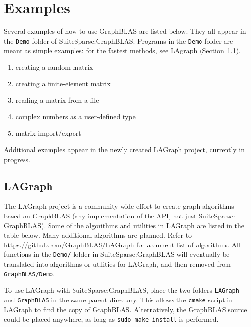 \documentclass[12pt]{article}
\begin{document}
\section{Examples} %
\label{examples}

Several examples of how to use GraphBLAS are listed below.  They all
appear in the \verb'Demo' folder of SuiteSparse:GraphBLAS.  Programs in
the \verb'Demo' folder are meant as simple examples; for the fastest methods,
see LAgraph (Section~\ref{lagraph}).

\begin{enumerate}
\item creating a random matrix
\item creating a finite-element matrix
\item reading a matrix from a file
\item complex numbers as a user-defined type
\item matrix import/export
\end{enumerate}

Additional examples appear in the newly created LAGraph project, currently in
progress.

\subsection{LAGraph}
\label{lagraph}

The LAGraph project is a community-wide effort to create graph algorithms based
on GraphBLAS (any implementation of the API, not just SuiteSparse: GraphBLAS).
Some of the algorithms and utilities in LAGraph are listed in the table below.
Many additional algorithms are planned.  Refer to
\url{https://github.com/GraphBLAS/LAGraph} for a current list of algorithms. All
functions in the \verb'Demo/' folder in SuiteSparse:GraphBLAS will eventually
be translated into algorithms or utilities for LAGraph, and then removed
from \verb'GraphBLAS/Demo'.

To use LAGraph with SuiteSparse:GraphBLAS, place the two folders \verb'LAGraph'
and \verb'GraphBLAS' in the same parent directory.  This allows the
\verb'cmake' script in LAGraph to find the copy of GraphBLAS.  Alternatively,
the GraphBLAS source could be placed anywhere, as long as
\verb'sudo make install' is performed.
\end{document}
